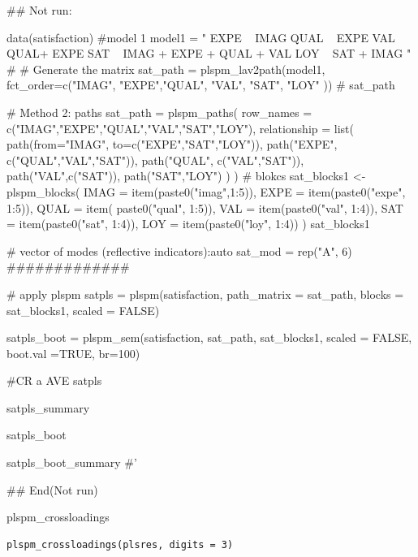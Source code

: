 \documentclass[a4paper]{book}
\begin{document}
\begin{Examples}
\begin{ExampleCode}

## Not run: 

data(satisfaction)
#model 1
model1 = "
EXPE ~ IMAG
QUAL ~ EXPE
VAL ~  QUAL+ EXPE
SAT ~ IMAG + EXPE + QUAL + VAL
LOY ~ SAT + IMAG
"
# # Generate the matrix
sat_path = plspm_lav2path(model1,
                          fct_order=c("IMAG", "EXPE","QUAL", "VAL", "SAT", "LOY" ))
# sat_path

# Method 2: paths
sat_path = plspm_paths(
  row_names = c("IMAG","EXPE","QUAL","VAL","SAT","LOY"),
  relationship = list(
    path(from="IMAG", to=c("EXPE","SAT","LOY")),
    path("EXPE", c("QUAL","VAL","SAT")),
    path("QUAL", c("VAL","SAT")),
    path("VAL",c("SAT")),
    path("SAT","LOY")
  )
)
# blokcs
sat_blocks1 <- plspm_blocks(
  IMAG = item(paste0("imag",1:5)),
  EXPE = item(paste0("expe", 1:5)),
  QUAL = item( paste0("qual", 1:5)),
  VAL = item(paste0("val", 1:4)),
  SAT = item(paste0("sat", 1:4)),
  LOY = item(paste0("loy", 1:4))
)
sat_blocks1

# vector of modes (reflective indicators):auto
sat_mod = rep("A", 6)
#############

# apply plspm
satpls = plspm(satisfaction,
                   path_matrix = sat_path,
                   blocks = sat_blocks1,
                   scaled = FALSE)

satpls_boot = plspm_sem(satisfaction, sat_path, sat_blocks1, scaled = FALSE,
                        boot.val =TRUE, br=100)

#CR a AVE
satpls%

satpls_summary%

satpls_boot%

satpls_boot_summary%
#'

## End(Not run)



\end{ExampleCode}
\end{Examples}
%
\begin{Description}
plspm\_crossloadings
\end{Description}
%
\begin{Usage}
\begin{verbatim}
plspm_crossloadings(plsres, digits = 3)
\end{verbatim}
\end{Usage}
\end{document}

